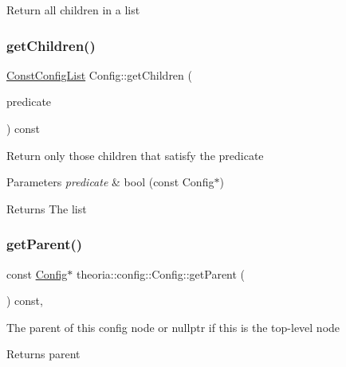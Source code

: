 Return all children in a list \mbox{\label{classtheoria_1_1config_1_1Config_a6433b53d322bd5bc78f67c8a8d9f2700}} 
\subsubsection{\texorpdfstring{get\+Children()}{getChildren()}\hspace{0.1cm}{\footnotesize\ttfamily [2/2]}}
{\footnotesize\ttfamily \hyperlink{classtheoria_1_1config_1_1Config_a61230728ffa4d92667a536c8c0f0ca30}{Const\+Config\+List} Config\+::get\+Children (\begin{DoxyParamCaption}\item[{const \hyperlink{classtheoria_1_1config_1_1Config_a293ebfd7146d935e232a066f7e6fa279}{Config\+Predicate} \&}]{predicate }\end{DoxyParamCaption}) const}

Return only those children that satisfy the predicate 
\begin{DoxyParams}{Parameters}
{\em predicate} & bool (const Config$\ast$) \\
\hline
\end{DoxyParams}
\begin{DoxyReturn}{Returns}
The list 
\end{DoxyReturn}
\mbox{\label{classtheoria_1_1config_1_1Config_ac30090b5eedf4126046d7ace48b5fa40}} 
\subsubsection{\texorpdfstring{get\+Parent()}{getParent()}}
{\footnotesize\ttfamily const \hyperlink{classtheoria_1_1config_1_1Config}{Config}$\ast$ theoria\+::config\+::\+Config\+::get\+Parent (\begin{DoxyParamCaption}{ }\end{DoxyParamCaption}) const\hspace{0.3cm}{\ttfamily [inline]}, {\ttfamily [noexcept]}}

The parent of this config node or nullptr if this is the top-\/level node \begin{DoxyReturn}{Returns}
parent 
\end{DoxyReturn}
\mbox{\label{classtheoria_1_1config_1_1Config_afe6803a6e3e6600ab4ce33a7417ffaa9}} 
